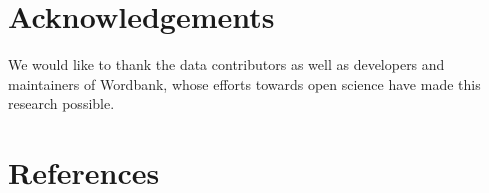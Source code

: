 \documentclass[10pt, letterpaper]{article}
\begin{document}
\section{Acknowledgements}\label{acknowledgements}

We would like to thank the data contributors as well as developers and
maintainers of Wordbank, whose efforts towards open science have made
this research possible.

\section{References}\label{references}

\setlength{\parindent}{-0.1in} 
\setlength{\leftskip}{0.125in}

\noindent

\label{refs}
\end{document}
